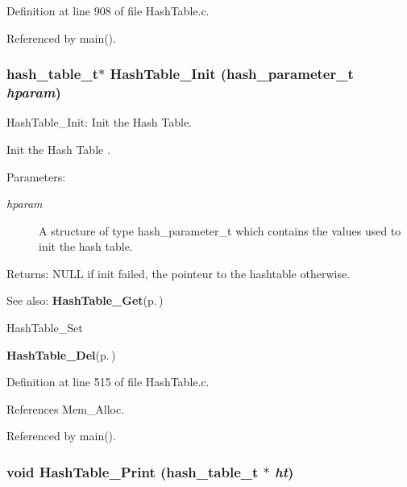 Definition at line 908 of file Hash\-Table.c.

Referenced by main().
\subsubsection{\setlength{\rightskip}{0pt plus 5cm}hash\_\-table\_\-t$\ast$ Hash\-Table\_\-Init (hash\_\-parameter\_\-t {\em hparam})}\label{group__HashTableExportedFunctions_ga0}


Hash\-Table\_\-Init: Init the Hash Table.

Init the Hash Table .

\begin{Desc}
\item[Parameters:]
\begin{description}
\item[{\em hparam}]A structure of type hash\_\-parameter\_\-t which contains the values used to init the hash table.\end{description}
\end{Desc}
\begin{Desc}
\item[Returns:]NULL if init failed, the pointeur to the hashtable otherwise.\end{Desc}
\begin{Desc}
\item[See also:]{\bf Hash\-Table\_\-Get}{\rm (p.\,\pageref{group__HashTableExportedFunctions_ga2})} 

Hash\-Table\_\-Set 

{\bf Hash\-Table\_\-Del}{\rm (p.\,\pageref{group__HashTableExportedFunctions_ga3})} \end{Desc}


Definition at line 515 of file Hash\-Table.c.

References Mem\_\-Alloc.

Referenced by main().
\subsubsection{\setlength{\rightskip}{0pt plus 5cm}void Hash\-Table\_\-Print (hash\_\-table\_\-t $\ast$ {\em ht})}\label{group__HashTableExportedFunctions_ga6}


